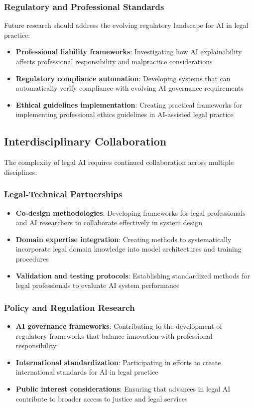 \subsubsection{Regulatory and Professional Standards}
Future research should address the evolving regulatory landscape for AI in legal practice:

\begin{itemize}
\item \textbf{Professional liability frameworks}: Investigating how AI explainability affects professional responsibility and malpractice considerations
\item \textbf{Regulatory compliance automation}: Developing systems that can automatically verify compliance with evolving AI governance requirements
\item \textbf{Ethical guidelines implementation}: Creating practical frameworks for implementing professional ethics guidelines in AI-assisted legal practice
\end{itemize}

\subsection{Interdisciplinary Collaboration}
\label{subsec:interdisciplinary_work}

The complexity of legal AI requires continued collaboration across multiple disciplines:

\subsubsection{Legal-Technical Partnerships}
\begin{itemize}
\item \textbf{Co-design methodologies}: Developing frameworks for legal professionals and AI researchers to collaborate effectively in system design
\item \textbf{Domain expertise integration}: Creating methods to systematically incorporate legal domain knowledge into model architectures and training procedures
\item \textbf{Validation and testing protocols}: Establishing standardized methods for legal professionals to evaluate AI system performance
\end{itemize}

\subsubsection{Policy and Regulation Research}
\begin{itemize}
\item \textbf{AI governance frameworks}: Contributing to the development of regulatory frameworks that balance innovation with professional responsibility
\item \textbf{International standardization}: Participating in efforts to create international standards for AI in legal practice
\item \textbf{Public interest considerations}: Ensuring that advances in legal AI contribute to broader access to justice and legal services
\end{itemize}


